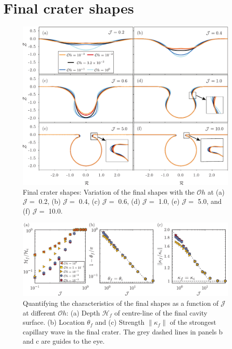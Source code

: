 \documentclass[final]{jfm}
\begin{document}
\section{Final crater shapes}\label{Sec::EquilibriumStates}
 \begin{figure}
	\centerline{\includegraphics[width=\linewidth]{Figure6_FinalShapes-eps-converted-to.pdf}}%
	\caption{Final crater shapes: Variation of the final shapes with the $\mathcal{O}h$ at (a) $\mathcal{J} =$ 0.2, (b) $\mathcal{J} =$ 0.4, (c) $\mathcal{J} =$ 0.6, (d) $\mathcal{J} =$ 1.0, (e) $\mathcal{J} =$ 5.0, and (f) $\mathcal{J} =$ 10.0.}
	\label{fig:Zoo_of_Final_Shapes}
\end{figure}
\begin{figure}
	\centerline{\includegraphics[width=\linewidth]{Figure7_FrozenState_Quantify-eps-converted-to.pdf}}%
	\caption{Quantifying the characteristics of the final shapes as a function of $\mathcal{J}$ at different $\mathcal{O}h$: (a) Depth $\mathcal{H}_f$ of centre-line of the final cavity surface. (b) Location $\theta_f$ and (c) Strength $\|\kappa_f\|$ of the strongest capillary wave in the final crater. The grey dashed lines in panels b and c are guides to the eye.}
	\label{fig:Quantification_Final_Shapes}
\end{figure}
\end{document}

